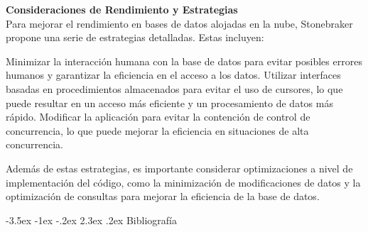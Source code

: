 \documentclass[11pt]{report}
\makeatletter
\renewcommand\chapter{\@startsection{chapter}{0}{\z@}%
    {-3.5ex \@plus -1ex \@minus -.2ex}%
    {2.3ex \@plus.2ex}%
    {\normalfont\Large\bfseries}}
\makeatother
\begin{document}
\textbf{Consideraciones de Rendimiento y Estrategias} \\
Para mejorar el rendimiento en bases de datos alojadas en la nube, Stonebraker propone una serie de estrategias detalladas. Estas incluyen:

Minimizar la interacción humana con la base de datos para evitar posibles errores humanos y garantizar la eficiencia en el acceso a los datos.
Utilizar interfaces basadas en procedimientos almacenados para evitar el uso de cursores, lo que puede resultar en un acceso más eficiente y un procesamiento de datos más rápido.
Modificar la aplicación para evitar la contención de control de concurrencia, lo que puede mejorar la eficiencia en situaciones de alta concurrencia.

Además de estas estrategias, es importante considerar optimizaciones a nivel de implementación del código, como la minimización de modificaciones de datos y la optimización de consultas
para mejorar la eficiencia de la base de datos.

\cleardoublepage

\chapter{Bibliografía}
\end{document}
